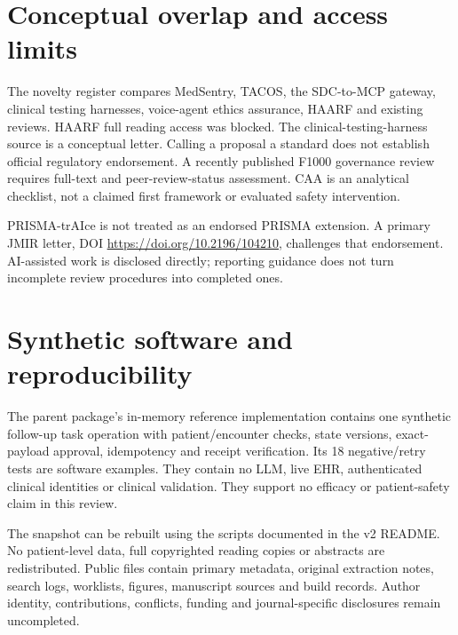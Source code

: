 \documentclass[journal,onecolumn,10pt]{IEEEtran}
\begin{document}
\section{Conceptual overlap and access limits}
The novelty register compares MedSentry, TACOS, the SDC-to-MCP gateway, clinical testing harnesses, voice-agent ethics assurance, HAARF and existing reviews. HAARF full reading access was blocked. The clinical-testing-harness source is a conceptual letter. Calling a proposal a standard does not establish official regulatory endorsement. A recently published F1000 governance review requires full-text and peer-review-status assessment. CAA is an analytical checklist, not a claimed first framework or evaluated safety intervention.

PRISMA-trAIce is not treated as an endorsed PRISMA extension. A primary JMIR letter, DOI \url{https://doi.org/10.2196/104210}, challenges that endorsement. AI-assisted work is disclosed directly; reporting guidance does not turn incomplete review procedures into completed ones.
\section{Synthetic software and reproducibility}
The parent package's in-memory reference implementation contains one synthetic follow-up task operation with patient/encounter checks, state versions, exact-payload approval, idempotency and receipt verification. Its 18 negative/retry tests are software examples. They contain no LLM, live EHR, authenticated clinical identities or clinical validation. They support no efficacy or patient-safety claim in this review.

The snapshot can be rebuilt using the scripts documented in the v2 README. No patient-level data, full copyrighted reading copies or abstracts are redistributed. Public files contain primary metadata, original extraction notes, search logs, worklists, figures, manuscript sources and build records. Author identity, contributions, conflicts, funding and journal-specific disclosures remain uncompleted.
\end{document}

